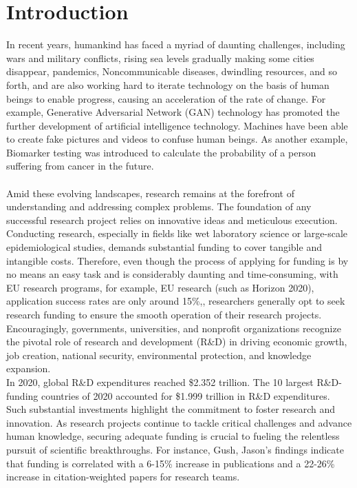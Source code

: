 \documentclass[12pt,twoside]{report}
\begin{document}
\chapter{Introduction}
In recent years, humankind has faced a myriad of daunting challenges, including wars and military conflicts, rising sea levels gradually making some cities disappear, pandemics, Noncommunicable diseases, dwindling resources, and so forth, and are also working hard to iterate technology on the basis of human beings to enable progress, causing an acceleration of the rate of change. For example, Generative Adversarial Network (GAN) technology has promoted the further development of artificial intelligence technology. Machines have been able to create fake pictures and videos to confuse human beings. As another example, Biomarker testing was introduced to calculate the probability of a person suffering from cancer in the future. \\
\\

Amid these evolving landscapes, research remains at the forefront of understanding and addressing complex problems. The foundation of any successful research project relies on innovative ideas and meticulous execution.\cite{neema2021research} Conducting research, especially in fields like wet laboratory science or large-scale epidemiological studies, demands substantial funding to cover tangible and intangible costs.\cite{schembri2018wasp} Therefore, even though the process of applying for funding is by no means an easy task and is considerably daunting and time-consuming, with EU research programs, for example, EU research (such as Horizon 2020), application success rates are only around 15\%,\cite{schembri2018wasp}, researchers generally opt to seek research funding to ensure the smooth operation of their research projects. Encouragingly, governments, universities, and nonprofit organizations recognize the pivotal role of research and development (R\&D) in driving economic growth, job creation, national security, environmental protection, and knowledge expansion.\cite{sargent2017global} \\

In 2020, global R\&D expenditures reached \$2.352 trillion. The 10 largest R\&D-funding countries of 2020 accounted for \$1.999 trillion in R\&D expenditures.\cite{sargent2017global} Such substantial investments highlight the commitment to foster research and innovation. As research projects continue to tackle critical challenges and advance human knowledge, securing adequate funding is crucial to fueling the relentless pursuit of scientific breakthroughs. For instance, Gush, Jason's findings indicate that funding is correlated with a 6-15\% increase in publications and a 22-26\% increase in citation-weighted papers for research teams.\cite{gush2018effect}
\end{document}
